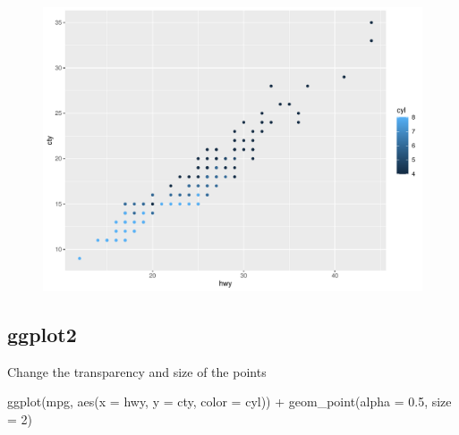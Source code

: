 \documentclass[
  letterpaper,
  DIV=11,
  numbers=noendperiod,
  landscape]{scrartcl}
\newenvironment{Shaded}{\begin{snugshade}}{\end{snugshade}}
\newcommand{\AttributeTok}[1]{\textcolor[rgb]{0.40,0.45,0.13}{#1}}
\newcommand{\DecValTok}[1]{\textcolor[rgb]{0.68,0.00,0.00}{#1}}
\newcommand{\FloatTok}[1]{\textcolor[rgb]{0.68,0.00,0.00}{#1}}
\newcommand{\FunctionTok}[1]{\textcolor[rgb]{0.28,0.35,0.67}{#1}}
\newcommand{\NormalTok}[1]{\textcolor[rgb]{0.00,0.23,0.31}{#1}}
\newcommand{\SpecialCharTok}[1]{\textcolor[rgb]{0.37,0.37,0.37}{#1}}
\begin{document}
\begin{figure}[H]

{\centering \includegraphics{RandRStudio_files/figure-pdf/unnamed-chunk-13-1.pdf}

}

\end{figure}

\hypertarget{ggplot2-3}{%
\subsection{ggplot2}\label{ggplot2-3}}

Change the transparency and size of the points

\begin{Shaded}
\begin{Highlighting}[numbers=left,,]
\FunctionTok{ggplot}\NormalTok{(mpg, }\FunctionTok{aes}\NormalTok{(}\AttributeTok{x =}\NormalTok{ hwy, }\AttributeTok{y =}\NormalTok{ cty, }\AttributeTok{color =}\NormalTok{ cyl)) }\SpecialCharTok{+}
  \FunctionTok{geom\_point}\NormalTok{(}\AttributeTok{alpha =} \FloatTok{0.5}\NormalTok{, }\AttributeTok{size =} \DecValTok{2}\NormalTok{)}
\end{Highlighting}
\end{Shaded}
\end{document}
